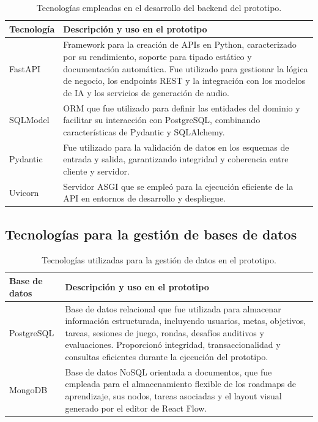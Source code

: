 \begin{table}[H]
\centering
\footnotesize
\begin{tabular}{| m{3.5cm} | m{11cm} |}
\hline
\textbf{Tecnología} & \textbf{Descripción y uso en el prototipo} \\
\hline
FastAPI & Framework para la creación de APIs en Python, caracterizado por su rendimiento, soporte para tipado estático y documentación automática. Fue utilizado para gestionar la lógica de negocio, los endpoints REST y la integración con los modelos de IA y los servicios de generación de audio. \\
\hline
SQLModel & ORM que fue utilizado para definir las entidades del dominio y facilitar su interacción con PostgreSQL, combinando características de Pydantic y SQLAlchemy. \\
\hline
Pydantic & Fue utilizado para la validación de datos en los esquemas de entrada y salida, garantizando integridad y coherencia entre cliente y servidor. \\
\hline
Uvicorn & Servidor ASGI que se empleó para la ejecución eficiente de la API en entornos de desarrollo y despliegue. \\
\hline
\end{tabular}
\caption{Tecnologías empleadas en el desarrollo del backend del prototipo.}
\end{table}

\subsection{Tecnologías para la gestión de bases de datos}

\begin{table}[H]
\centering
\footnotesize
\begin{tabular}{| m{3.5cm} | m{11cm} |}
\hline
\textbf{Base de datos} & \textbf{Descripción y uso en el prototipo} \\
\hline
PostgreSQL & Base de datos relacional que fue utilizada para almacenar información estructurada, incluyendo usuarios, metas, objetivos, tareas, sesiones de juego, rondas, desafíos auditivos y evaluaciones. Proporcionó integridad, transaccionalidad y consultas eficientes durante la ejecución del prototipo. \\
\hline
MongoDB & Base de datos NoSQL orientada a documentos, que fue empleada para el almacenamiento flexible de los roadmaps de aprendizaje, sus nodos, tareas asociadas y el layout visual generado por el editor de React Flow. \\
\hline
\end{tabular}
\caption{Tecnologías utilizadas para la gestión de datos en el prototipo.}
\end{table}

